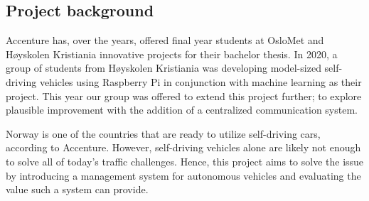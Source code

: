 \subsection{Project background}
Accenture has, over the years, offered final year students at OsloMet and Høyskolen Kristiania innovative projects for their bachelor thesis. In 2020, a group of students from Høyskolen Kristiania was developing model-sized self-driving vehicles using Raspberry Pi in conjunction with machine learning as their project. This year our group was offered to extend this project further; to explore plausible improvement with the addition of a centralized communication system.

Norway is one of the countries that are ready to utilize self-driving cars, according to Accenture. However, self-driving vehicles alone are likely not enough to solve all of today's traffic challenges. Hence, this project aims to solve the issue by introducing a management system for autonomous vehicles and evaluating the value such a system can provide.

